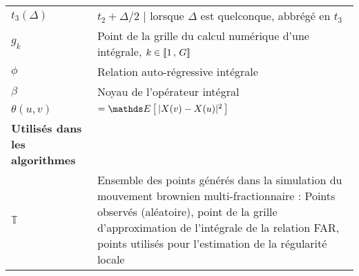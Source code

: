 \begin{table}[H]
\begin{tabularx}{\textwidth}{lX}
		$t_3(\Delta)$                                    & $t_2 + \Delta/2$ | lorsque $\Delta$ est quelconque, abbrégé en $t_3$                                                                                                                                                                                    \\
		$g_k$                                            & Point de la grille du calcul numérique d'une intégrale, $k \in \llbracket 1 \, , \, G \rrbracket$                                                                                                                                                                       \\
		\midrule
		$\phi$                                           & Relation auto-régressive intégrale                                                                                                                                                                                                                      \\
		$\beta$                                          & Noyau de l'opérateur intégral                                                                                                                                                                                                                           \\
		\midrule
		$\theta(u,v)$                                    & $= \esperance{ |X(v) - X(u)|^2 }$                                                                                                                                                                                                                       \\
		\toprule
		\textbf{Utilisés dans les algorithmes}                                                                                                                                                                                                                                                                     \\
		\midrule
		$\mathds T$                                      & Ensemble des points générés dans la simulation du mouvement brownien multi-fractionnaire : Points observés (aléatoire), point de la grille d'approximation de l'intégrale de la relation FAR, points utilisés pour l'estimation de la régularité locale \\
		\bottomrule
	\end{tabularx}
\end{table}
